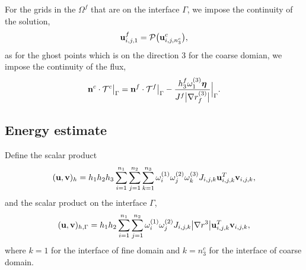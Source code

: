 \documentclass[a4paper]{article}
\begin{document}
For the grids in the $\Omega^f$  that are on the interface $\Gamma$, we impose the continuity of the solution,
\begin{equation*}
{\bf u}_{i,j,1}^f = \mathcal{P}\big({\bf u}_{i,j,n_3^c}^c\big),
\end{equation*}
as for the ghost points which is on the direction 3 for the coarse domian, we impose the continuity of the flux,
\begin{equation*}
{\bf n}^c\cdot\mathcal{T}^c \big|_\Gamma = {\bf n}^f\cdot\mathcal{T}^f\big|_\Gamma - \frac{h_3^f\omega_1^{(3)}{\bm \eta}}{J^f\big|\nabla r_f^{(3)}\big|}\Big|_\Gamma.
\end{equation*}

\subsection{Energy estimate}


Define the scalar product 
\begin{equation*}
({\bf u}, {\bf v})_h = h_1h_2h_3\sum_{i=1}^{n_1}\sum_{j=1}^{n_2}\sum_{k=1}^{n_3}\omega_i^{(1)}\omega_j^{(2)}\omega_k^{(3)}J_{i,j,k}{\bf u}^{T}_{i,j,k}{\bf v}_{i,j,k},
\end{equation*}
and the scalar product on the interface $\Gamma$,
\begin{equation*}
({\bf u}, {\bf v})_{h,\Gamma} = h_1h_2\sum_{i=1}^{n_1}\sum_{j=1}^{n_2}\omega_i^{(1)}\omega_j^{(2)}J_{i,j,k}\big|\nabla r^{3}\big|{\bf u}_{i,j,k}^{T}{\bf v}_{i,j,k},
\end{equation*}
where $k = 1$ for the interface of fine domain and $k = n_3^c$ for the interface of coarse domain.
\end{document}
